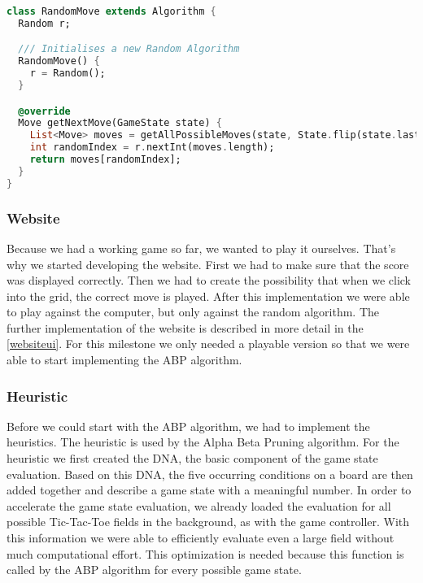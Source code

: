 \begin{lstlisting}[language=Dart,caption={Implementation of the \texttt{RandomMove}}]
class RandomMove extends Algorithm {
  Random r;

  /// Initialises a new Random Algorithm
  RandomMove() {
    r = Random();
  }

  @override
  Move getNextMove(GameState state) {
    List<Move> moves = getAllPossibleMoves(state, State.flip(state.lastMove.state));
    int randomIndex = r.nextInt(moves.length);
    return moves[randomIndex];
  }
}
\end{lstlisting}

\subsubsection{Website}
Because we had a working game so far, we wanted to play it ourselves. That's why we started developing the website. First we had to make sure that the score was displayed correctly. Then we had to create the possibility that when we click into the grid, the correct move is played. After this implementation we were able to play against the computer, but only against the random algorithm. The further implementation of the website is described in more detail in the \autoref{websiteui}. For this milestone we only needed a playable version so that we were able to start implementing the \ac{ABP} algorithm.

\subsubsection{Heuristic}
Before we could start with the \ac{ABP} algorithm, we had to implement the heuristics. The heuristic is used by the Alpha Beta Pruning algorithm. For the heuristic we first created the DNA, the basic component of the game state evaluation. Based on this DNA, the five occurring conditions on a board  are then added together and describe a game state with a meaningful number. In order to accelerate the game state evaluation, we already loaded the evaluation for all possible Tic-Tac-Toe fields in the background, as with the game controller. With this information we were able to efficiently evaluate even a large field without much computational effort. This optimization is needed because this function is called by the \ac{ABP} algorithm for every possible game state.

